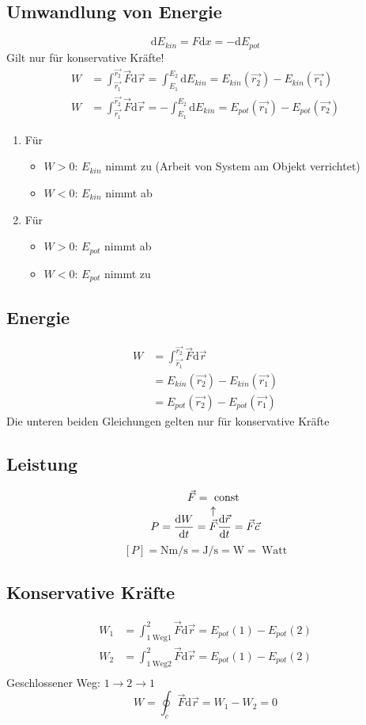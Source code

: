 \documentclass[a4paper]{scrartcl}
\renewcommand{\d}{\mathrm{d}}
\renewcommand{\v}[1]{\vec{#1}}
\theoremstyle{definition}
\theoremstyle{plain}
\theoremstyle{plain}
\theoremstyle{remark}
\theoremstyle{remark}
\theoremstyle{remark}
\begin{document}
\subsection{Umwandlung von Energie}
\label{sec-4-5}
\[\d E_{kin} = F\d x = -\d E_{pot}\]
Gilt nur für konservative Kräfte!
\begin{align}
W &= \int_{\v{r_1}}^{\v{r_2}} \v F\d \v r = \int_{E_1}^{E_2} \d E_{kin} = E_{kin}(\v{r_2}) - E_{kin}(\v{r_1}) \\
W &= \int_{\v{r_1}}^{\v{r_2}} \v F\d \v r = -\int_{E_1}^{E_2} \d E_{kin} = E_{pot}(\v{r_1}) - E_{pot}(\v{r_2})
\end{align}
\begin{enumerate}
\item Für
\begin{itemize}
\item $W > 0$: $E_{kin}$ nimmt zu (Arbeit von System am Objekt verrichtet)
\item $W < 0$: $E_{kin}$ nimmt ab
\end{itemize}
\item Für
\begin{itemize}
\item $W > 0$: $E_{pot}$ nimmt ab
\item $W < 0$: $E_{pot}$ nimmt zu
\end{itemize}
\end{enumerate}
\subsection{Energie}
\label{sec-4-6}
\begin{align}
W &= \int_{\v{r_1}}^{\v{r_2}} \v F \d \v r \\
&= E_{kin}(\v{r_2}) - E_{kin}(\v{r_1}) \\
&= E_{pot}(\v{r_2}) - E_{pot}(\v{r_1})
\end{align}
Die unteren beiden Gleichungen gelten nur für konservative Kräfte
\subsection{Leistung}
\label{sec-4-7}
\[P = \frac{\d W}{\d t} = \overarrow[\v F]{$\v F =~\text{const}$} \frac{\d \v r}{\d t} = \v F \v c\]
\[[P] = \si{\newton\meter\per\second} = \si{\joule\per\second} = \si{\watt} = ~\text{Watt}\]
\subsection{Konservative Kräfte}
\label{sec-4-8}
\begin{align}
W_1 &= \int_{1~\text{Weg1}}^2 \v F\d \v r = E_{pot}(1) - E_{pot}(2) \\
W_2 &= \int_{1~\text{Weg2}}^2 \v F\d \v r = E_{pot}(1) - E_{pot}(2) \\
\end{align}
Geschlossener Weg: $1\to 2\to 1$
\[W=\oint_c \v F\d \v r = W_1 - W_2 = 0\]
\end{document}
